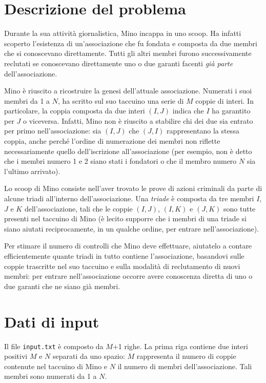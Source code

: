 \documentclass[a4paper,11pt]{article}
\begin{document}
\vspace{0.5cm}



\vspace{0.5cm}

\section*{Descrizione del problema}
   
Durante la sua attività giornalistica, Mino incappa in uno
scoop. Ha infatti scoperto l'esistenza di un'associazione che fu fondata
e composta da due membri che si conoscevano direttamente.
Tutti gli altri membri furono successivamente reclutati se conoscevano
direttamente uno o due garanti facenti \emph{già parte}
dell'associazione.

Mino è riuscito a ricostruire la genesi dell'attuale
associazione. Numerati i suoi membri da 1 a $N$, ha scritto
sul suo taccuino una serie di $M$ coppie di interi. In
particolare, la coppia composta da due interi $(I,J)$ indica
che $I$ ha garantito per $J$ o viceversa. Infatti,
Mino non è riuscito a stabilire chi dei due sia entrato per
primo nell'associazione: sia $(I,J)$ che $(J,I)$
rappresentano la stessa coppia, anche perché l'ordine di
numerazione dei membri non riflette necessariamente quello
dell'iscrizione all'associazione (per esempio, non è detto che i
membri numero 1 e 2 siano stati i fondatori o che il membro numero
$N$ sia l'ultimo arrivato).

Lo scoop di Mino consiste nell'aver trovato le prove di azioni
criminali da parte di alcune triadi all'interno dell'associazione.
Una \emph{triade} è composta da tre membri $I$,
$J$ e $K$ dell'associazione, tali che le coppie
$(I,J)$, $(I,K)$ e $(J,K)$ sono tutte
presenti nel taccuino di Mino (è lecito supporre che i membri
di una triade si siano aiutati reciprocamente, in un qualche ordine,
per entrare nell'associazione).

Per stimare il numero di controlli che Mino deve effettuare, aiutatelo
a contare efficientemente quante triadi in tutto contiene
l'associazione, basandovi sulle coppie trascritte nel suo taccuino e
sulla modalità di reclutamento di nuovi membri: per entrare
nell'associazione occorre avere conoscenza diretta di uno o due
garanti che ne siano già membri.


\section*{Dati di input}
  Il file \texttt{input.txt} è composto da $M$+1
righe.
La prima riga contiene due interi positivi $M$ e
$N$ separati da uno spazio: $M$ rappresenta il
numero di coppie contenute nel taccuino di Mino e $N$ il numero
di membri dell'associazione. Tali membri sono numerati da 1 a $N$. 
\end{document}
